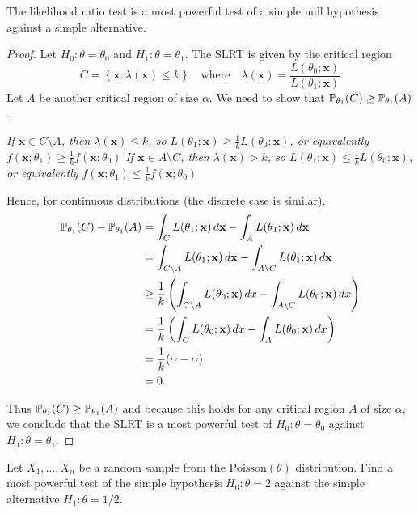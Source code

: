 \begin{theorem}
The likelihood ratio test is a most powerful test of a simple null hypothesis against a simple alternative.
\end{theorem}
\begin{proof}
Let $H_0:\theta=\theta_0$ and  $H_1:\theta=\theta_1$. The SLRT is given by the critical region
\[
C = \left\{\mathbf{x}:\lambda(\mathbf{x}) \leq k\right\}
\quad\text{where}\quad
\lambda(\mathbf{x}) = \frac{L(\theta_0;\mathbf{x})}{L(\theta_1;\mathbf{x})}
\]
Let $A$ be another critical region of size $\alpha$. We need to show that $\mathbb{P}_{\theta_1}(C) \geq \mathbb{P}_{\theta_1}(A)$.

\bit
\it If $\mathbf{x}\in C\setminus A$, then $\lambda(\mathbf{x})\leq k$, so $L(\theta_1;\mathbf{x}) \geq \displaystyle\frac{1}{k}L(\theta_0;\mathbf{x})$, or equivalently  $f(\mathbf{x};\theta_1) \geq \displaystyle\frac{1}{k}f(\mathbf{x};\theta_0)$
\it If $\mathbf{x}\in A\setminus C$, then $\lambda(\mathbf{x})> k$, so $L(\theta_1;\mathbf{x}) \leq \displaystyle\frac{1}{k}L(\theta_0;\mathbf{x})$, or equivalently $f(\mathbf{x};\theta_1) \leq \displaystyle\frac{1}{k}f(\mathbf{x};\theta_0)$
\eit

Hence, for continuous distributions (the discrete case is similar),
\begin{align*}
\mathbb{P}_{\theta_1}(C) - \mathbb{P}_{\theta_1}(A)
	& = \int_{C} L(\theta_1;\mathbf{x})\,d\mathbf{x} - \int_{A} L(\theta_1;\mathbf{x})\,d\mathbf{x} \\
	& = \int_{C\setminus A} L(\theta_1;\mathbf{x})\,d\mathbf{x} - \int_{A\setminus C} L(\theta_1;\mathbf{x})\,d\mathbf{x} \\
	& \geq \frac{1}{k}\left(\int_{C\setminus A} L(\theta_0;\mathbf{x})\,dx - \int_{A\setminus C} L(\theta_0;\mathbf{x})\,dx\right) \\
	& = \frac{1}{k}\left(\int_{C} L(\theta_0;\mathbf{x})\,dx - \int_{A} L(\theta_0;\mathbf{x})\,dx\right) \\
	& = \frac{1}{k}(\alpha-\alpha) \\
	& = 0.
\end{align*}

Thus $\mathbb{P}_{\theta_1}(C) \geq \mathbb{P}_{\theta_1}(A)$ and because this holds for any critical region $A$ of size $\alpha$, we conclude that the SLRT is a most powerful test of $H_0:\theta=\theta_0$ against $H_1:\theta=\theta_1$.
\end{proof}


\begin{example}%
Let $X_1,\ldots,X_n$ be a random sample from the $\text{Poisson}(\theta)$ distribution. Find a most powerful test of the simple hypothesis $H_0:\theta=2$ against the simple alternative $H_1:\theta = 1/2$.
\end{example}

